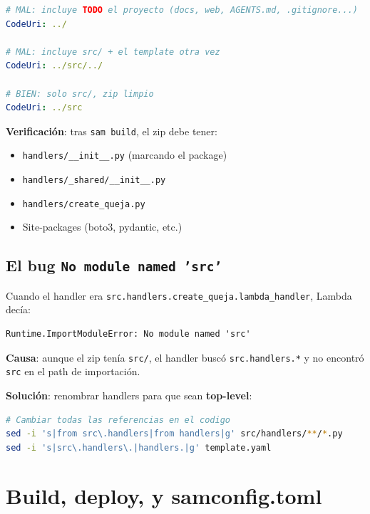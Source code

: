 \documentclass[11pt,a4paper,oneside]{article}
\newcommand{\filename}[1]{\texttt{\small #1}}
\begin{document}
\begin{lstlisting}[language=yaml,caption={Comparaci\'on de CodeUri}]
# MAL: incluye TODO el proyecto (docs, web, AGENTS.md, .gitignore...)
CodeUri: ../

# MAL: incluye src/ + el template otra vez
CodeUri: ../src/../

# BIEN: solo src/, zip limpio
CodeUri: ../src
\end{lstlisting}

\textbf{Verificaci\'on}: tras \texttt{sam build}, el zip debe tener:
\begin{itemize}
  \item \filename{handlers/\_\_init\_\_.py} (marcando el package)
  \item \filename{handlers/\_shared/\_\_init\_\_.py}
  \item \filename{handlers/create\_queja.py}
  \item Site-packages (boto3, pydantic, etc.)
\end{itemize}

\subsection{El bug \texttt{No module named 'src'}}

Cuando el handler era \texttt{src.handlers.create\_queja.lambda\_handler}, Lambda dec\'ia:

\begin{lstlisting}
Runtime.ImportModuleError: No module named 'src'
\end{lstlisting}

\textbf{Causa}: aunque el zip ten\'ia \texttt{src/}, el handler busc\'o \texttt{src.handlers.*} y no encontr\'o \texttt{src} en el path de importaci\'on.

\textbf{Soluci\'on}: renombrar handlers para que sean \textbf{top-level}:

\begin{lstlisting}[language=bash]
# Cambiar todas las referencias en el codigo
sed -i 's|from src\.handlers|from handlers|g' src/handlers/**/*.py
sed -i 's|src\.handlers\.|handlers.|g' template.yaml
\end{lstlisting}

\section{Build, deploy, y samconfig.toml}
\end{document}
